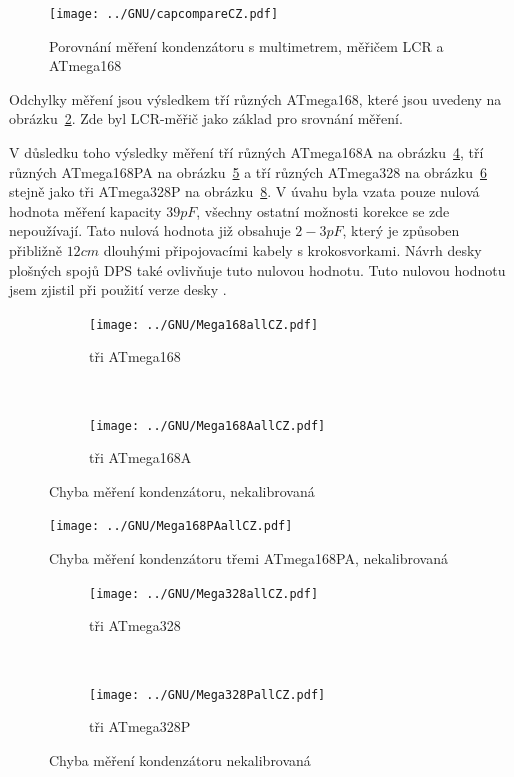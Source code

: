 \begin{figure}[H]
\centering
\texttt{[image: ../GNU/capcompareCZ.pdf]}
\caption{Porovnání měření kondenzátoru s multimetrem, měřičem LCR a ATmega168}
\label{fig:capcompare}
\end{figure}

Odchylky měření jsou výsledkem tří různých ATmega168, které jsou uvedeny na obrázku~\ref{fig:mega168all}.
Zde byl LCR-měřič jako základ pro srovnání měření.

V důsledku toho výsledky měření tří různých ATmega168A na obrázku~\ref{fig:mega168Aall}, 
tří různých ATmega168PA na obrázku~\ref{fig:mega168PAall}  a tří různých
ATmega328 na obrázku~\ref{fig:mega328all} stejně jako tři ATmega328P na obrázku~\ref{fig:mega328Pall}.
V úvahu byla vzata pouze nulová hodnota měření kapacity \(39pF\), všechny ostatní možnosti korekce se zde
nepoužívají.
Tato nulová hodnota již obsahuje \(2-3pF\), který je způsoben přibližně \(12cm\) dlouhými připojovacími kabely s krokosvorkami.
Návrh desky plošných spojů DPS také ovlivňuje tuto nulovou hodnotu.
Tuto nulovou hodnotu jsem zjistil při použití verze desky .

\begin{figure}[H]
  \begin{subfigure}[b]{.5\textwidth}
    \centering
    \texttt{[image: ../GNU/Mega168allCZ.pdf]}
    \caption{tři ATmega168}
    \label{fig:mega168all}
  \end{subfigure}
  ~
  \begin{subfigure}[b]{.5\textwidth}
    \centering
    \texttt{[image: ../GNU/Mega168AallCZ.pdf]}
    \caption{tři ATmega168A}
    \label{fig:mega168Aall}
  \end{subfigure}
  \caption{Chyba měření kondenzátoru, nekalibrovaná}
\end{figure}

\begin{figure}[H]
\centering
\texttt{[image: ../GNU/Mega168PAallCZ.pdf]}
\caption{Chyba měření kondenzátoru třemi ATmega168PA, nekalibrovaná}
\label{fig:mega168PAall}
\end{figure}

\begin{figure}[H]
  \begin{subfigure}[b]{.5\textwidth}
    \centering
    \texttt{[image: ../GNU/Mega328allCZ.pdf]}
    \caption{tři ATmega328}
    \label{fig:mega328all}
  \end{subfigure}
  ~
  \begin{subfigure}[b]{.5\textwidth}
    \centering
    \texttt{[image: ../GNU/Mega328PallCZ.pdf]}
    \caption{tři ATmega328P}
    \label{fig:mega328Pall}
  \end{subfigure}
  \caption{Chyba měření kondenzátoru nekalibrovaná}
\end{figure}

